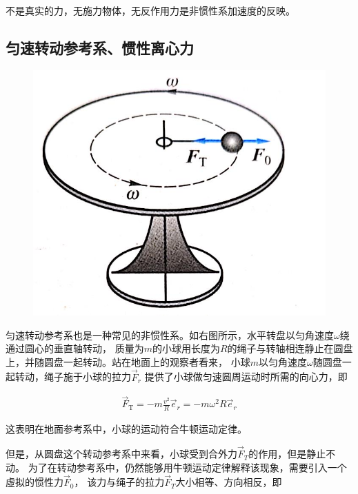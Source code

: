 \documentclass[
	12pt, %
	a4paper, %
]{myLegrandOrangeBook}
\begin{document}
    不是真实的力，无施力物体，无反作用力是非惯性系加速度的反映。

\subsection{匀速转动参考系、惯性离心力}
    
    \begin{figure}
        \centering
        \includegraphics[scale=0.2]{"Chapter 02 images/pic1.jpg"}
        \label{pic1}
    \end{figure}

    匀速转动参考系也是一种常见的非惯性系。如右图所示，水平转盘以匀角速度\(\omega\)绕通过圆心的垂直轴转动，
    质量为\(m\)的小球用长度为\(R\)的绳子与转轴相连静止在圆盘上，并随圆盘一起转动。站在地面上的观察者看来，
    小球\(m\)以匀角速度\(\omega\)随圆盘一起转动，绳子施于小球的拉力\(\overrightarrow{F}_{r}\)
    提供了小球做匀速圆周运动时所需的向心力，即

    \begin{align}
        \overrightarrow{F}_{\mathrm{T}}=-m \frac{v^2}{R} \overrightarrow{e}_r=-m \omega^2 R \overrightarrow{e}_r
    \end{align}

    这表明在地面参考系中，小球的运动符合牛顿运动定律。

    但是，从圆盘这个转动参考系中来看，小球受到合外力\(\overrightarrow{F}_{T}\)的作用，但是静止不动。
    为了在转动参考系中，仍然能够用牛顿运动定律解释该现象，需要引入一个虛拟的惯性力\(\overrightarrow{F}_{0}\)，
    该力与绳子的拉力\(\overrightarrow{F}_{T}\)大小相等、方向相反，即
\end{document}
